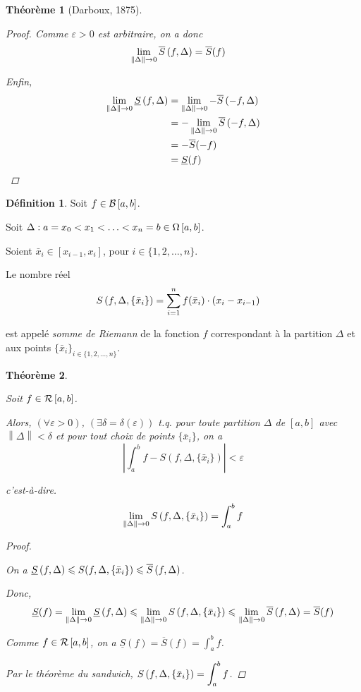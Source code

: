 \documentclass{report}
\newcommand*{\Ssup}[1]{\overline{S}(#1)}
\newcommand*{\Sinf}[1]{\underline{S}(#1)}
\newcommand*{\dsum}[4]{\displaystyle\sum_{#1=#2}^{#3}#4}
\newcommand*{\dlim}[3]{\displaystyle\lim_{#1 \to #2}#3}
\newcommand*{\dint}[3]{\displaystyle\int_{#1}^{#2}#3}
\newcommand*{\norme}[1]{\left\| #1 \right\|}
\newcommand*{\abs}[1]{\left| #1 \right|}
\newcommand*{\eps}{\varepsilon}
\newcommand*{\lte}{\leqslant}
\newtheorem*{thm}{Th\'eor\`eme}
\theoremstyle{definition}
\newtheorem*{defin}{D\'efinition}
\theoremstyle{remark}
\begin{document}
\begin{thm}[Darboux, 1875]
\begin{proof}
			Comme $\eps>0$ est arbitraire, on a donc
			\begin{align*}
				\dlim{\norme{\Delta}}{0}{\ssup{f}}&= \Ssup{f}
			\end{align*}

			Enfin,
			\begin{align*}
				\dlim{\norme{\Delta}}{0}{\sinf{f}}&= \dlim{\norme{\Delta}}{0}{-\ssup{-f}}\\
				&= -\dlim{\norme{\Delta}}{0}{\ssup{-f}}\\
				&= -\Ssup{-f}\\
				&= \Sinf{f}
			\end{align*}
		\end{proof}
	\end{thm}

	\begin{defin}


		Soit $f \in \bornee$.

		Soit $\Delta : a=x_0 < x_1 < \dotsc < x_n=b \in \partitions$.

		Soient $\bar{x}_i \in [x_{i-1},x_i]$, pour $i \in \{1,2,\dots,n\}$.

		Le nombre r\'eel
		\begin{align*}
			\srie{f}&= \dsum{i}{1}{n}{f(\bar{x}_i) \cdot (x_i-x_{i-1})}
		\end{align*}

		est appel\'e \emph{somme de Riemann} de la fonction $f$ correspondant \`a la partition $\Delta$ et aux points $\{\bar{x}_i\}_{i \in \{1,2,\dots,n\}}$.
	\end{defin}

	\begin{thm}
		~

		Soit $f \in \riemann$.

		Alors, $(\forall\eps>0)$, $(\exists\delta=\delta(\eps))$ t.q. pour toute partition $\Delta$ de $[a,b]$ avec $\norme{\Delta}<\delta$ et pour tout choix de points $\{\bar{x}_i\}$, on a
		\[
		\abs{\dint{a}{b}{f} - S(f, \Delta, \{\bar{x}_i\})} < \eps
		\]

		c'est-\`a-dire.
		\[
		\dlim{\norme{\Delta}}{0}{\srie{f}} = \dint{a}{b}{f}
		\]
		\begin{proof}~

			On a $\sinf{f} \lte S(f, \Delta, \{\bar{x}_i\}) \lte \ssup{f}$.

			Donc,
			\[
			\Sinf{f} = \dlim{\norme{\Delta}}{0}{\sinf{f}} \lte \dlim{\norme{\Delta}}{0}{\srie{f}} \lte \dlim{\norme{\Delta}}{0}{\ssup{f}} = \Ssup{f}
			\]

			Comme $f \in \riemann$, on a $\Sinf{f} = \Ssup{f} = \dint{a}{b}{f}$.

			Par le th\'eor\`eme du sandwich, $\srie{f} = \dint{a}{b}{f}$.
		\end{proof}
	\end{thm}
\end{document}
